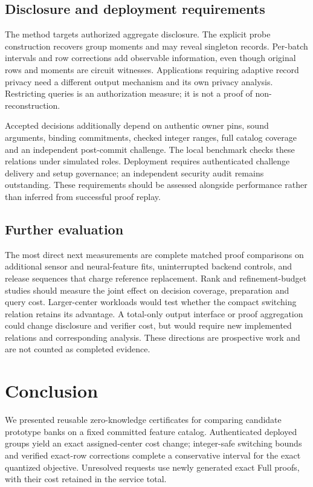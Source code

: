 \subsection{Disclosure and deployment requirements}
The method targets authorized aggregate disclosure. The explicit probe
construction recovers group moments and may reveal singleton records.
Per-batch intervals and row corrections add observable information, even
though original rows and moments are circuit witnesses. Applications
requiring adaptive record privacy need a different output mechanism and
its own privacy analysis. Restricting queries is an authorization measure;
it is not a proof of non-reconstruction.

Accepted decisions additionally depend on authentic owner pins, sound
arguments, binding commitments, checked integer ranges, full catalog
coverage and an independent post-commit challenge. The local benchmark
checks these relations under simulated roles. Deployment requires
authenticated challenge delivery and setup governance; an independent
security audit remains outstanding. These requirements should be assessed
alongside performance rather than inferred from successful proof replay.

\subsection{Further evaluation}
The most direct next measurements are complete matched proof comparisons
on additional sensor and neural-feature fits, uninterrupted backend
controls, and release sequences that charge reference replacement. Rank
and refinement-budget studies should measure the joint effect on decision
coverage, preparation and query cost. Larger-center workloads would test
whether the compact switching relation retains its advantage. A total-only
output interface or proof aggregation could change disclosure and verifier
cost, but would require new implemented relations and corresponding
analysis. These directions are prospective work and are not counted as
completed evidence.

\section{Conclusion}\label{sec:conclusion}
We presented reusable zero-knowledge certificates for comparing candidate
prototype banks on a fixed committed feature catalog. Authenticated deployed
groups yield an exact assigned-center cost change; integer-safe switching
bounds and verified exact-row corrections complete a conservative interval
for the exact quantized objective. Unresolved requests use newly generated
exact Full proofs, with their cost retained in the service total.

